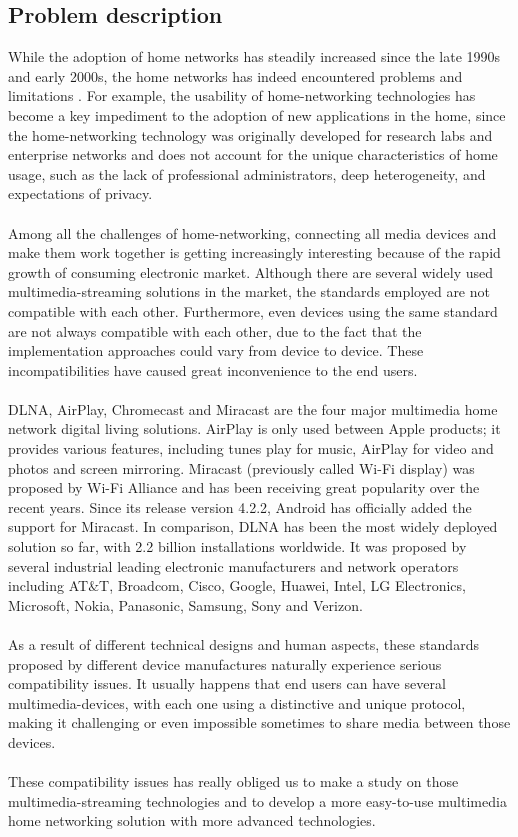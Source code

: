 \subsection{Problem description}
While the adoption of home networks has steadily increased since the late 1990s
and early 2000s, the home networks has indeed encountered problems and limitations
\cite{stateofHN}. For example, the usability of home-networking technologies has become
a key impediment to the adoption of new applications in the home, since the home-networking technology was originally developed for
 research labs and enterprise networks and does not account for the unique
 characteristics of home usage, such as the lack of professional administrators, deep
heterogeneity, and expectations of privacy.\\
\\
Among all the challenges of home-networking, connecting all media devices and make them work together is getting increasingly interesting because of the rapid growth of consuming electronic market. Although there are
 several widely used multimedia-streaming solutions in the market, the 
standards employed are not compatible with each other. Furthermore, even devices using
the same standard are not always compatible with each other, due to the fact
that the implementation approaches could vary from device to device. These
incompatibilities have caused great inconvenience to the end users.\\
\\
DLNA, AirPlay, Chromecast and Miracast are the four major multimedia home network
digital living solutions. AirPlay is only used between Apple products; it
provides various features, including tunes play for music, AirPlay for video
and photos and screen mirroring. Miracast (previously called Wi-Fi display) was
proposed by Wi-Fi Alliance and has been receiving great popularity over the recent years.
Since its release version 4.2.2, Android has officially added the support for Miracast. In comparison, DLNA has been the most widely deployed solution so far, with 2.2 billion installations worldwide.
It was proposed by several industrial leading electronic manufacturers and network operators 
including AT$\&$T, Broadcom, Cisco, Google, Huawei, Intel, LG Electronics, Microsoft, Nokia, 
Panasonic, Samsung, Sony and Verizon.\\
\\
As a result of different technical designs and  human aspects, these standards proposed by
different device manufactures naturally experience serious compatibility issues. It usually happens that
end users can have several multimedia-devices, with each one using a
distinctive and unique  protocol, making it challenging or even impossible
sometimes to share media between those devices.\\
\\
These compatibility issues has really obliged us to make a study on those multimedia-streaming
 technologies and to develop a more easy-to-use multimedia home networking solution
 with more  advanced technologies.

